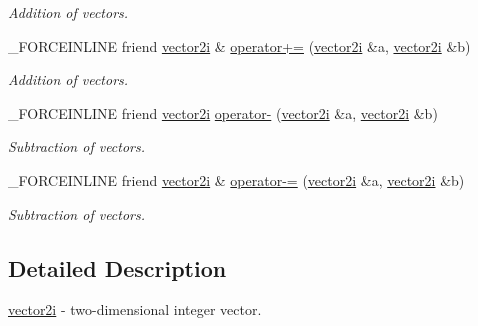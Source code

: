 \begin{DoxyCompactItemize}
\begin{DoxyCompactList}\small\item\em Addition of vectors. \end{DoxyCompactList}\item 
\hypertarget{classbt_1_1vector2i_a4a349a958688e7263bd96e43934862e3}{\-\_\-\-F\-O\-R\-C\-E\-I\-N\-L\-I\-N\-E friend \hyperlink{classbt_1_1vector2i}{vector2i} \& \hyperlink{classbt_1_1vector2i_a4a349a958688e7263bd96e43934862e3}{operator+=} (\hyperlink{classbt_1_1vector2i}{vector2i} \&a, \hyperlink{classbt_1_1vector2i}{vector2i} \&b)}\label{classbt_1_1vector2i_a4a349a958688e7263bd96e43934862e3}

\begin{DoxyCompactList}\small\item\em Addition of vectors. \end{DoxyCompactList}\item 
\hypertarget{classbt_1_1vector2i_a3f90498bb191fb95af452fcf69819b84}{\-\_\-\-F\-O\-R\-C\-E\-I\-N\-L\-I\-N\-E friend \hyperlink{classbt_1_1vector2i}{vector2i} \hyperlink{classbt_1_1vector2i_a3f90498bb191fb95af452fcf69819b84}{operator-\/} (\hyperlink{classbt_1_1vector2i}{vector2i} \&a, \hyperlink{classbt_1_1vector2i}{vector2i} \&b)}\label{classbt_1_1vector2i_a3f90498bb191fb95af452fcf69819b84}

\begin{DoxyCompactList}\small\item\em Subtraction of vectors. \end{DoxyCompactList}\item 
\hypertarget{classbt_1_1vector2i_af18b07c334a15a457e14d9dcaeba5a85}{\-\_\-\-F\-O\-R\-C\-E\-I\-N\-L\-I\-N\-E friend \hyperlink{classbt_1_1vector2i}{vector2i} \& \hyperlink{classbt_1_1vector2i_af18b07c334a15a457e14d9dcaeba5a85}{operator-\/=} (\hyperlink{classbt_1_1vector2i}{vector2i} \&a, \hyperlink{classbt_1_1vector2i}{vector2i} \&b)}\label{classbt_1_1vector2i_af18b07c334a15a457e14d9dcaeba5a85}

\begin{DoxyCompactList}\small\item\em Subtraction of vectors. \end{DoxyCompactList}\end{DoxyCompactItemize}


\subsection{Detailed Description}
\hyperlink{classbt_1_1vector2i}{vector2i} -\/ two-\/dimensional integer vector. 

